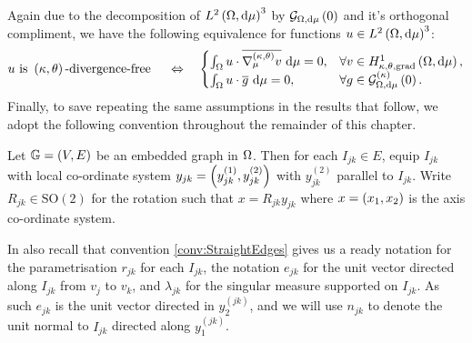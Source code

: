 Again due to the decomposition of $L^{2}\left( \Omega,\mathrm{d}\mu \right)^3$ by $\mathcal{G}_{ \Omega, \mathrm{d}\mu}\left( 0 \right)$ and it's orthogonal compliment, we have the following equivalence for functions $u\in L^{2}\left( \Omega,\mathrm{d}\mu \right)^3$:
\begin{align*}
	u \text{ is } \left( \kappa, \theta \right)\text{-divergence-free } \quad\Leftrightarrow\quad
	\begin{cases}
		\int_{\Omega} u\cdot\overline{\nabla^{\left( \kappa, \theta \right)}_{\mu}v}  \ \mathrm{d}\mu = 0, & \forall v\in H^1_{\kappa,\theta,\mathrm{grad}}\left( \Omega, \mathrm{d}\mu \right), \\
		\int_{\Omega} u\cdot\overline{g}  \ \mathrm{d}\mu = 0, & \forall g\in\mathcal{G}_{ \Omega, \mathrm{d}\mu}^{(\kappa)}\left( 0 \right).
	\end{cases}
\end{align*}
Finally, to save repeating the same assumptions in the results that follow, we adopt the following convention throughout the remainder of this chapter.
\begin{convention} \label{conv:LocalEdgeCoords}
	Let $\mathbb{G}=\left( V,E \right)$ be an embedded graph in $\Omega$.
	Then for each $I_{jk}\in E$, equip $I_{jk}$ with local co-ordinate system $y_{jk} = \left( y_{jk}^{(1)},y_{jk}^{(2)} \right)$ with $y_{jk}^{(2)}$ parallel to $I_{jk}$.
	Write $R_{jk}\in\mathrm{SO}(2)$ for the rotation such that $x=R_{jk}y_{jk}$ where $x=\left( x_1,x_2 \right)$ is the axis co-ordinate system.
\end{convention}
In also recall that convention \ref{conv:StraightEdges} gives us a ready notation for the parametrisation $r_{jk}$ for each $I_{jk}$, the notation $e_{jk}$ for the unit vector directed along $I_{jk}$ from $v_j$ to $v_k$, and $\lambda_{jk}$ for the singular measure supported on $I_{jk}$.
As such $e_{jk}$ is the unit vector directed in $y^{(jk)}_2$, and we will use $n_{jk}$ to denote the unit normal to $I_{jk}$ directed along $y^{(jk)}_1$.

